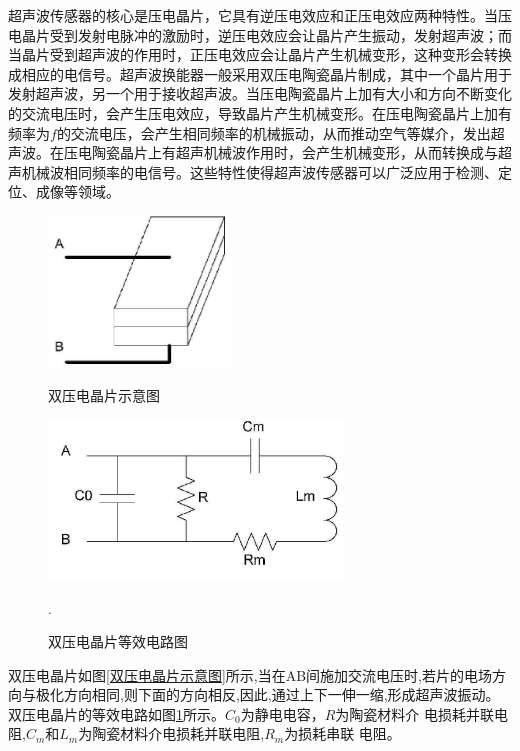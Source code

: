     超声波传感器的核心是压电晶片，它具有逆压电效应和正压电效应两种特性。当压电晶片受到发射电脉冲的激励时，逆压电效应会让晶片产生振动，发射超声波；而当晶片受到超声波的作用时，正压电效应会让晶片产生机械变形，这种变形会转换成相应的电信号。超声波换能器一般采用双压电陶瓷晶片制成，其中一个晶片用于发射超声波，另一个用于接收超声波。当压电陶瓷晶片上加有大小和方向不断变化的交流电压时，会产生压电效应，导致晶片产生机械变形。在压电陶瓷晶片上加有频率为$f$的交流电压，会产生相同频率的机械振动，从而推动空气等媒介，发出超声波。在压电陶瓷晶片上有超声机械波作用时，会产生机械变形，从而转换成与超声机械波相同频率的电信号。这些特性使得超声波传感器可以广泛应用于检测、定位、成像等领域。\par
    \begin{figure}[!h]

    	\begin{minipage}{0.5\textwidth}
    		\centering
    		\includegraphics[height=4cm]{figure/双压电晶片示意图.png}
    		\caption{双压电晶片示意图}
    		\label{双压电晶片示意图}
    	\end{minipage}
    \begin{minipage}{0.5\textwidth}
    	\centering
    	\includegraphics[height=4.25cm]{figure/双压电晶片等效电路.png}
    	\caption{双压电晶片等效电路图}
    	\label{双压电晶片等效电路图}.
    \end{minipage}
    	
 
    \end{figure}
    双压电晶片如图\ref{双压电晶片示意图}所示,当在AB间施加交流电压时,若片的电场方向与极化方向相同,则下面的方向相反,因此,通过上下一伸一缩,形成超声波振动。双压电晶片的等效电路如图\ref{双压电晶片等效电路图}所示。$C_0$为静电电容，$R$为陶瓷材料介 电损耗并联电阻,$C_m$和$L_m$为陶瓷材料介电损耗并联电阻,$R_m$为损耗串联 电阻。\par

